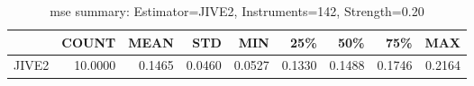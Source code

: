 \begin{table}[ht]
\centering
\caption{mse summary: Estimator=JIVE2, Instruments=142, Strength=0.20}
\begin{tabular}{lrrrrrrrr}
\toprule
 & COUNT & MEAN & STD & MIN & 25\% & 50\% & 75\% & MAX \\
\midrule
JIVE2 & 10.0000 & 0.1465 & 0.0460 & 0.0527 & 0.1330 & 0.1488 & 0.1746 & 0.2164 \\
\bottomrule
\end{tabular}
\end{table}
